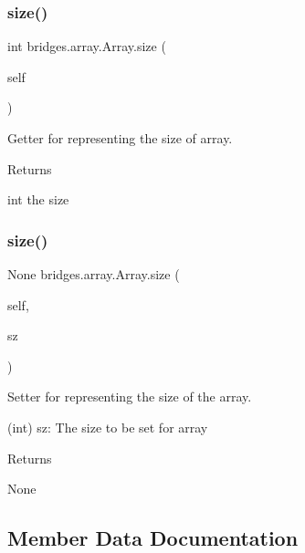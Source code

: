 \subsubsection{\texorpdfstring{size()}{size()}\hspace{0.1cm}{\footnotesize\ttfamily [1/2]}}
{\footnotesize\ttfamily  int bridges.\+array.\+Array.\+size (\begin{DoxyParamCaption}\item[{}]{self }\end{DoxyParamCaption})}



Getter for representing the size of array. 

\begin{DoxyReturn}{Returns}


int the size 
\end{DoxyReturn}
\mbox{\label{classbridges_1_1array_1_1_array_a50f6b3cf7794221428038cc84f868e25}} 
\subsubsection{\texorpdfstring{size()}{size()}\hspace{0.1cm}{\footnotesize\ttfamily [2/2]}}
{\footnotesize\ttfamily  None bridges.\+array.\+Array.\+size (\begin{DoxyParamCaption}\item[{}]{self,  }\item[{int}]{sz }\end{DoxyParamCaption})}



Setter for representing the size of the array. 

\begin{DoxyVerb}       (int) sz: The size to be set for array
\end{DoxyVerb}
 \begin{DoxyReturn}{Returns}


None 
\end{DoxyReturn}


\subsection{Member Data Documentation}
\mbox{\label{classbridges_1_1array_1_1_array_a69f2c673a6077e203b3e916dd73cd243}} 
